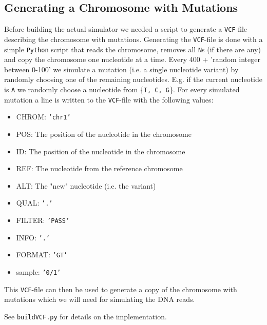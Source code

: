 \documentclass[10pt,a4paper]{article}
\begin{document}
\subsection{Generating a Chromosome with Mutations}
Before building the actual simulator we needed a script to generate a \texttt{VCF}-file describing the chromosome with mutations. Generating the \texttt{VCF}-file is done with a simple \texttt{Python} script that reads the chromosome, removes all \texttt{N}s (if there are any) and copy the chromosome one nucleotide at a time. Every 400 + 'random integer between 0-100' we simulate a mutation (i.e. a single nucleotide variant) by randomly choosing one of the remaining nucleotides. E.g. if the current nucleotide is \texttt{A} we randomly choose a nucleotide from \{\texttt{T, C, G}\}. For every simulated mutation a line is written to the \texttt{VCF}-file with the following values:
\begin{itemize}
\item CHROM: \texttt{'chr1'}
\item POS: The position of the nucleotide in the chromosome
\item ID: The position of the nucleotide in the chromosome
\item REF: The nucleotide from the reference chromosome
\item ALT: The "new" nucleotide (i.e. the variant)
\item QUAL: \texttt{'.'}
\item FILTER: \texttt{'PASS'}
\item INFO: \texttt{'.'}
\item FORMAT: \texttt{'GT'}
\item sample: \texttt{'0/1'}
\end{itemize}
This \texttt{VCF}-file can then be used to generate a copy of the chromosome with mutations which we will need for simulating the DNA reads.

See \texttt{buildVCF.py} for details on the implementation.
\end{document}
